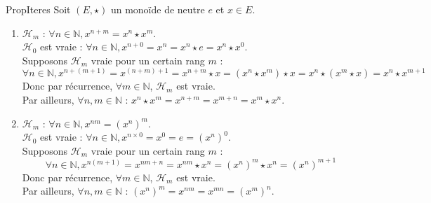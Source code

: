 \documentclass[12pt,a4paper]{report}
\begin{document}
    \begin{demonstration}{PropIteres}
    Soit $(E, \star)$ un monoïde de neutre $e$ et $x \in E$.
    \begin{enumerate}[label=\bfseries\arabic*)]
        \item $\mathcal{H}_m$ : $\forall n \in \mathbb{N}, x^{n + m} = x^n \star x^m$.\\
        $\mathcal{H}_0$ est vraie : $\forall n \in \mathbb{N}, x^{n + 0} = x^n = x^n \star e = x^n \star x^0$.\\
        Supposons $\mathcal{H}_m$ vraie pour un certain rang $m$ :
            $$ \forall n \in \mathbb{N}, x^{n + (m + 1)} = x^{(n + m) + 1} = x^{n + m} \star x = \left(x^n \star x^m\right) \star x = x^n \star \left(x^m \star x\right) = x^n \star x^{m + 1} $$
        Donc par récurrence, $\forall m \in \mathbb{N}$, $\mathcal{H}_m$ est vraie.\\
        Par ailleurs, $\forall n, m \in \mathbb{N}$ : $x^n \star x^m = x^{n + m} = x^{m + n} = x^m \star x^n$.
        
        \item $\mathcal{H}_m$ : $\forall n \in \mathbb{N}, x^{nm} = \left(x^n\right)^m$.\\
        $\mathcal{H}_0$ est vraie : $\forall n \in \mathbb{N}, x^{n \times 0} = x^0 = e = \left(x^n\right)^0$.\\
        Supposons $\mathcal{H}_m$ vraie pour un certain rang $m$ :
            $$ \forall n \in \mathbb{N}, x^{n(m + 1)} = x^{nm + n} = x^{nm} \star x^n = \left(x^n\right)^m \star x^n = \left(x^n\right)^{m + 1} $$
        Donc par récurrence, $\forall m \in \mathbb{N}$, $\mathcal{H}_m$ est vraie.\\
        Par ailleurs, $\forall n, m \in \mathbb{N}$ : $\left(x^n\right)^m = x^{nm} = x^{mn} = \left(x^m\right)^n$.
    \end{enumerate}
    \end{demonstration}
    
\end{document}
